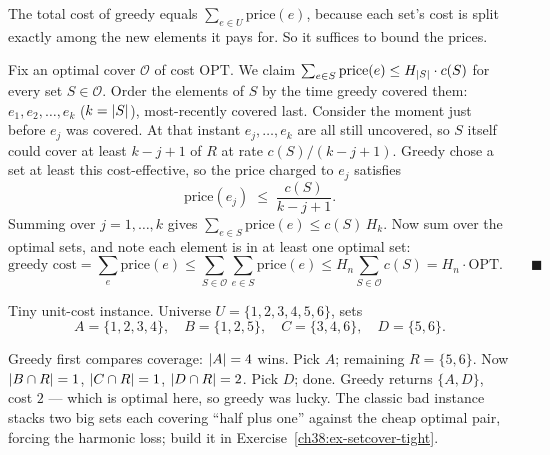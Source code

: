 \begin{whybox}
The total cost of greedy equals $\sum_{e\in U}\text{price}(e)$, because each set's cost is split
exactly among the new elements it pays for. So it suffices to bound the prices.

Fix an optimal cover $\mathcal{O}$ of cost $\mathrm{OPT}$. We claim
$\sum_{e\in S}\text{price}(e)\le H_{\lvert S\rvert}\cdot c(S)$ for every set $S\in\mathcal{O}$. Order the
elements of $S$ by the time greedy covered them: $e_1,e_2,\dots,e_k$ ($k=\lvert S\rvert$), most-recently
covered last. Consider the moment just before $e_j$ was covered. At that instant $e_j,\dots,e_k$ are
all still uncovered, so $S$ itself could cover at least $k-j+1$ of $R$ at rate
$c(S)/(k-j+1)$. Greedy chose a set at least this cost-effective, so the price charged to $e_j$
satisfies
\[
  \text{price}(e_j) \;\le\; \frac{c(S)}{k-j+1}.
\]
Summing over $j=1,\dots,k$ gives $\sum_{e\in S}\text{price}(e)\le c(S)\,H_k$. Now sum over the optimal
sets, and note each element is in at least one optimal set:
\[
  \text{greedy cost} = \sum_{e}\text{price}(e) \le \sum_{S\in\mathcal{O}}\sum_{e\in S}\text{price}(e)
  \le H_n \sum_{S\in\mathcal{O}} c(S) = H_n\cdot\mathrm{OPT}. \qquad\blacksquare
\]
\end{whybox}

\begin{labbox}
Tiny unit-cost instance. Universe $U=\{1,2,3,4,5,6\}$, sets
\[
  A=\{1,2,3,4\},\quad B=\{1,2,5\},\quad C=\{3,4,6\},\quad D=\{5,6\}.
\]

\begin{center}
\end{center}

Greedy first compares coverage: $\lvert A\rvert=4$ wins. Pick $A$; remaining $R=\{5,6\}$. Now
$\lvert B\cap R\rvert=1$, $\lvert C\cap R\rvert=1$, $\lvert D\cap R\rvert=2$. Pick $D$; done. Greedy returns $\{A,D\}$,
cost $2$ --- which is optimal here, so greedy was lucky. The classic bad instance stacks two big
sets each covering ``half plus one'' against the cheap optimal pair, forcing the harmonic loss; build
it in Exercise~\ref{ch38:ex-setcover-tight}.
\end{labbox}


